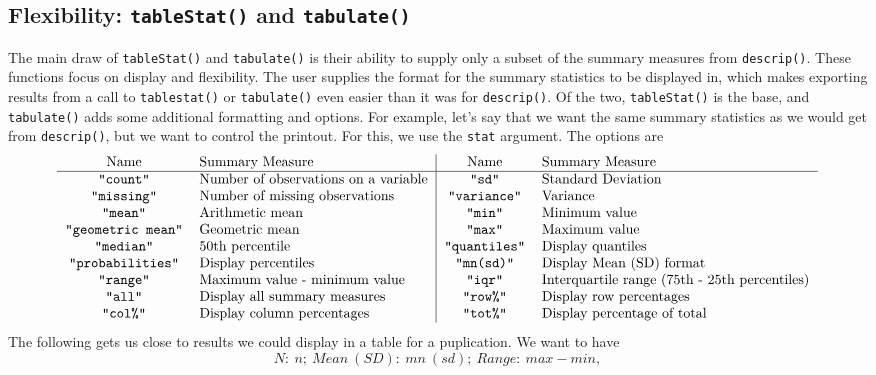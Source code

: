 \documentclass[landscape]{article}
\begin{document}
\subsection{Flexibility: \texttt{tableStat()} and \texttt{tabulate()}}
The main draw of \texttt{tableStat()} and \texttt{tabulate()} is their ability to supply only a subset of the summary measures from \texttt{descrip()}. These functions focus on display and flexibility. The user supplies the format for the summary statistics to be displayed in, which makes exporting results from a call to \texttt{tablestat()} or \texttt{tabulate()} even easier than it was for \texttt{descrip()}. Of the two, \texttt{tableStat()} is the base, and \texttt{tabulate()} adds some additional formatting and options. For example, let's say that we want the same summary statistics as we would get from \texttt{descrip()}, but we want to control the printout. For this, we use the \texttt{stat} argument. The options are 
\begin{displaymath}
\begin{tabular}{cl|cl}
Name & Summary Measure & Name & Summary Measure\\
\hline
\texttt{"count"} & Number of observations on a variable & \texttt{"sd"} & Standard Deviation\\
\texttt{"missing"} & Number of missing observations & \texttt{"variance"} & Variance\\
\texttt{"mean"} & Arithmetic mean & \texttt{"min"} & Minimum value\\
\texttt{"geometric mean"} & Geometric mean & \texttt{"max"} & Maximum value\\
\texttt{"median"} & 50th percentile & \texttt{"quantiles"} & Display quantiles\\
\texttt{"probabilities"} & Display percentiles & \texttt{"mn(sd)"} & Display Mean (SD) format\\
\texttt{"range"} & Maximum value - minimum value & \texttt{"iqr"} & Interquartile range (75th - 25th percentiles)\\
\texttt{"all"} & Display all summary measures & \texttt{"row\%"} & Display row percentages\\
\texttt{"col\%"} & Display column percentages & \texttt{"tot\%"} & Display percentage of total\\
\end{tabular}
\label{stattable}
\end{displaymath}
The following gets us close to results we could display in a table for a puplication. We want to have 
\begin{displaymath}
N: \ n; \ Mean \ (SD): \ mn \ (sd); \ Range: \ max - min,
\end{displaymath}
\end{document}
